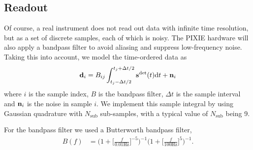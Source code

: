 \documentclass{article}
\renewcommand{\vec}[1]{{\bf #1}}
\begin{document}
\subsection{Readout}
Of course, a real instrument does not read out data with infinite
time resolution, but as a set of discrete samples, each of which is
noisy. The PIXIE hardware will also apply a bandpass filter to avoid
aliasing and suppress low-frequency noise. Taking this into account,
we model the time-ordered data as
\begin{align}
	\vec d_i = B_{ij} \int_{t_j-\Delta t/2}^{t_j+\Delta t/2} \vec s^\textrm{det}(t) \textrm{d}t + \vec n_i
\end{align}
where $i$ is the sample index, $B$ is the bandpass filter, $\Delta t$ is the sample
interval and $\vec n_i$ is the noise in sample $i$. We implement this
sample integral by using Gaussian quadrature with $N_\textrm{sub}$ sub-samples,
with a typical value of $N_\textrm{sub}$ being 9.

For the bandpass filter we used a Butterworth bandpass filter,
\begin{align}
	B(f) &= \Big(1+\Big[\frac{f}{0.01\textrm{Hz}}\Big]^{-5}\Big)^{-1}
		\Big(1+\Big[\frac{f}{100\textrm{Hz}}\Big]^{5}\Big)^{-1}.
\end{align}
\end{document}

